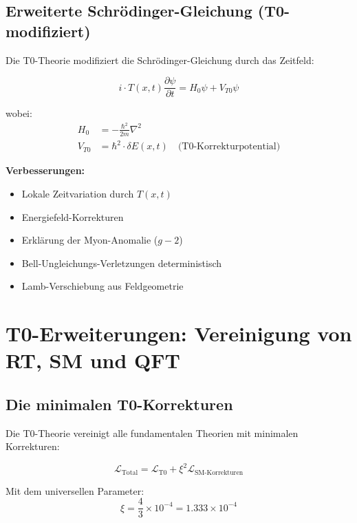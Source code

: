 \documentclass[12pt,a4paper]{article}
\begin{document}
	\subsection{Erweiterte Schrödinger-Gleichung (T0-modifiziert)}
	
	Die T0-Theorie modifiziert die Schrödinger-Gleichung durch das Zeitfeld:
	
	\begin{t0box}
		\begin{equation}
			i \cdot T(x,t) \frac{\partial\psi}{\partial t} = H_0 \psi + V_{T0} \psi
		\end{equation}
		
		wobei:
		\begin{align}
			H_0 &= -\frac{\hbar^2}{2m} \nabla^2 \\
			V_{T0} &= \hbar^2 \cdot \delta E(x,t) \quad \text{(T0-Korrekturpotential)}
		\end{align}
	\end{t0box}
	
	\textbf{Verbesserungen:}
	\begin{itemize}
		\item Lokale Zeitvariation durch $T(x,t)$
		\item Energiefeld-Korrekturen
		\item Erklärung der Myon-Anomalie ($g-2$)
		\item Bell-Ungleichungs-Verletzungen deterministisch
		\item Lamb-Verschiebung aus Feldgeometrie
	\end{itemize}
	
	\section{T0-Erweiterungen: Vereinigung von RT, SM und QFT}
	
	\subsection{Die minimalen T0-Korrekturen}
	
	Die T0-Theorie vereinigt alle fundamentalen Theorien mit minimalen Korrekturen:
	
	\begin{t0box}[T0-Vereinheitlichung]
		\begin{equation}
			\mathcal{L}_{\text{Total}} = \mathcal{L}_{\text{T0}} + \xi^2 \mathcal{L}_{\text{SM-Korrekturen}}
		\end{equation}
		
		Mit dem universellen Parameter:
		\begin{equation}
			\xi = \frac{4}{3} \times 10^{-4} = 1.333 \times 10^{-4}
		\end{equation}
	\end{t0box}
	
\end{document}
